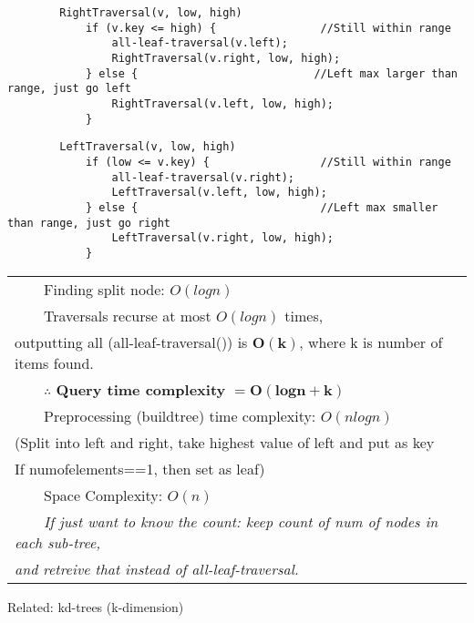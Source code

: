 \documentclass{article}
\newcommand{\tabitem}{~~\llap{\textbullet}~~}
\begin{document}
    \begin{verbatim}
        RightTraversal(v, low, high)
            if (v.key <= high) {                //Still within range
                all-leaf-traversal(v.left);
                RightTraversal(v.right, low, high);
            } else {                           //Left max larger than range, just go left
                RightTraversal(v.left, low, high);
            }
    \end{verbatim}

    \begin{verbatim}
        LeftTraversal(v, low, high)
            if (low <= v.key) {                 //Still within range
                all-leaf-traversal(v.right);
                LeftTraversal(v.left, low, high);
            } else {                            //Left max smaller than range, just go right
                LeftTraversal(v.right, low, high);
            }
    \end{verbatim}

    \bigskip

    \begin{tabular}{l}
        \tabitem Finding split node: $O(logn)$\\
        \tabitem Traversals recurse at most $O(logn)$ times, \\outputting all (all-leaf-traversal())
        is $\bm{O(k)}$, where k is number of items found.\\
        \tabitem $\therefore$ \textbf{Query time complexity } $\bm{ = O(logn + k)}$\\
        \tabitem Preprocessing (buildtree) time complexity: $O(nlogn)$\\
        (Split into left and right, take highest value of left and put as key\\
        If numofelements==1, then set as leaf)\\
        \tabitem Space Complexity: $O(n)$\\
        \tabitem \emph{If just want to know the count: keep count of num of nodes in each sub-tree,} \\
        \emph{and retreive that instead of all-leaf-traversal.}\\
    \end{tabular}

    \bigskip

    \noindent Related: kd-trees (k-dimension)



    \pagebreak
\end{document}
